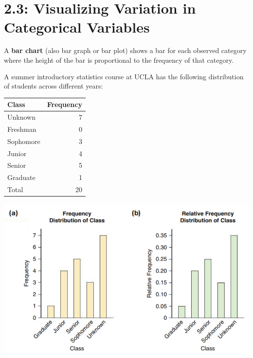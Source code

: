 \documentclass[../mathNotesPreamble]{subfiles}
\begin{document}
  \section{2.3: Visualizing Variation in Categorical Variables}
  \begin{defn*}
    A \textbf{bar chart} (also bar graph or bar plot) shows a bar for each observed category where the height of the bar is proportional to the frequency of that category.
  \end{defn*}
  \begin{ex*}
    A summer introductory statistics course at UCLA has the following distribution of students across different years:
  \end{ex*}
  
  \noindent
  \begin{minipage}{0.3\linewidth}
    \begin{center}
      \begin{tabular}{@{}lr@{}}\toprule
        Class& Frequency\\\midrule
        Unknown& 7\\
        Freshman& 0\\
        Sophomore& 3\\
        Junior& 4\\
        Senior& 5\\
        Graduate& 1\\\midrule
        Total& 20\\\bottomrule
      \end{tabular}
    \end{center}
  \end{minipage}%
  \begin{minipage}{0.625\linewidth}
    \includegraphics[width=\linewidth]{images/math211_figure_2p25}
  \end{minipage}
  
\end{document}
